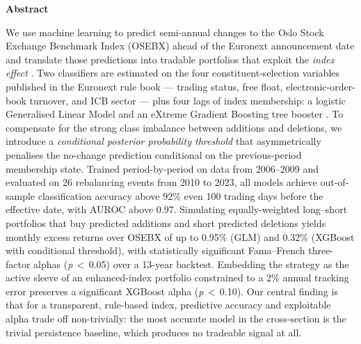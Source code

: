 \begin{center}
{\bfseries Abstract}
\end{center}
\noindent
\small
We use machine learning to predict semi-annual changes to the Oslo Stock Exchange Benchmark Index (OSEBX) ahead of the Euronext announcement date and translate those predictions into tradable portfolios that exploit the \emph{index effect} \parencite{shleifer-do-demand-curves-for-stocks-slope-down}. Two classifiers are estimated on the four constituent-selection variables published in the Euronext rule book \parencite{OSEBX-rule-book} --- trading status, free float, electronic-order-book turnover, and ICB sector --- plus four lags of index membership: a logistic Generalised Linear Model \parencite{glm-generalized-linear-models} and an eXtreme Gradient Boosting tree booster \parencite{xgboost-a-scaleable-tree-boosting-system}. To compensate for the strong class imbalance between additions and deletions, we introduce a \emph{conditional posterior probability threshold} that asymmetrically penalises the no-change prediction conditional on the previous-period membership state. Trained period-by-period on data from 2006--2009 and evaluated on 26 rebalancing events from 2010 to 2023, all models achieve out-of-sample classification accuracy above 92\% even 100 trading days before the effective date, with AUROC above 0.97. Simulating equally-weighted long--short portfolios that buy predicted additions and short predicted deletions yields monthly excess returns over OSEBX of up to 0.95\% (GLM) and 0.32\% (XGBoost with conditional threshold), with statistically significant Fama--French three-factor alphas (\textit{p}\,$<$\,0.05) over a 13-year backtest. Embedding the strategy as the active sleeve of an enhanced-index portfolio constrained to a 2\% annual tracking error preserves a significant XGBoost alpha (\textit{p}\,$<$\,0.10). Our central finding is that for a transparent, rule-based index, predictive accuracy and exploitable alpha trade off non-trivially: the most accurate model in the cross-section is the trivial persistence baseline, which produces no tradeable signal at all.
\normalsize

\vspace{1em}
